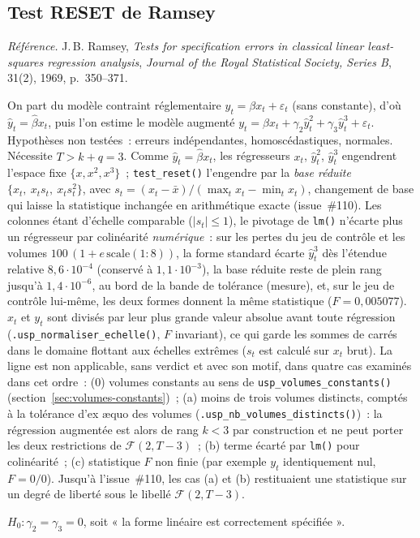 \documentclass[a4paper,11pt]{article}
\newcommand{\code}[1]{\texttt{\small #1}}
\newcommand{\refl}[1]{{\small\textcolor{maincolor!70!black}{\textit{Référence.} #1}}\par\smallskip}
\newcounter{ficheid}
\newenvironment{fiche}[1]{%
  \stepcounter{ficheid}%
  \phantomsection
  \subsection{#1}%
  \label{fiche:\theficheid}%
}{%
  \end{description}\vspace{0.5em}%
}
\newcommand{\Cadre}{%
  \begin{description}[leftmargin=0pt, style=unboxed, itemsep=3pt, topsep=3pt, parsep=2pt]%
  \item[\textcolor{financeblue}{\textbf{1. Cadre, notations et hypothèses de validité (non testées).}}]}
\newcommand{\Hzero}{\item[\textcolor{financeblue}{\textbf{2. Hypothèse nulle.}}]}
\begin{document}
\begin{fiche}{Test RESET de Ramsey}
\label{fiche:reset}%
\refl{J.\,B. Ramsey, \emph{Tests for specification errors in classical linear least-squares
regression analysis}, \emph{Journal of the Royal Statistical Society, Series B}, 31(2), 1969,
p.~350--371.}
\Cadre
On part du modèle contraint réglementaire $y_t = \beta x_t + \varepsilon_t$ (sans constante),
d'où $\hat y_t = \hat\beta x_t$, puis l'on estime le modèle augmenté
$y_t = \beta x_t + \gamma_2 \hat y_t^2 + \gamma_3 \hat y_t^3 + \varepsilon_t$.
Hypothèses non testées~: erreurs indépendantes, homoscédastiques, normales. Nécessite
$T > k + q = 3$. Comme $\hat y_t = \hat\beta x_t$, les régresseurs $x_t$, $\hat y_t^2$, $\hat y_t^3$
engendrent l'espace fixe $\{x, x^2, x^3\}$~; \code{test\_reset()} l'engendre par la \emph{base
réduite} $\{x_t,\ x_t s_t,\ x_t s_t^2\}$, avec $s_t = (x_t - \bar x)/(\max_t x_t - \min_t x_t)$,
changement de base qui laisse la statistique inchangée en arithmétique exacte (issue~\#110). Les
colonnes étant d'échelle comparable ($|s_t| \le 1$), le pivotage de \code{lm()} n'écarte plus
un régresseur par colinéarité \emph{numérique}~: sur les pertes du jeu de contrôle et les volumes
$100\,(1 + e\,\mathrm{scale}(1{:}8))$, la forme standard écarte $\hat y_t^3$ dès l'étendue
relative $8{,}6\cdot 10^{-4}$ (conservé à $1{,}1\cdot 10^{-3}$), la base réduite reste de plein
rang jusqu'à $1{,}4\cdot 10^{-6}$, au bord de la bande de tolérance (mesure), et, sur le jeu de
contrôle lui-même, les deux formes donnent la même statistique ($F = 0{,}005077$). $x_t$ et
$y_t$ sont divisés par leur plus grande valeur absolue avant toute régression
(\code{.usp\_normaliser\_echelle()}, $F$ invariant), ce qui garde les sommes de carrés dans le
domaine flottant aux échelles extrêmes ($s_t$ est calculé sur $x_t$ brut). La ligne est non
applicable, sans verdict et avec son motif, dans quatre cas examinés dans cet ordre~: (0)
volumes constants au sens de \code{usp\_volumes\_constants()}
(section~\ref{sec:volumes-constants})~; (a) moins de trois volumes distincts, comptés à la
tolérance d'ex \ae quo des volumes (\code{.usp\_nb\_volumes\_distincts()})~: la régression
augmentée est alors de rang $k < 3$ par construction et ne peut porter les deux restrictions de
$\mathcal{F}(2, T-3)$~; (b) terme écarté par \code{lm()} pour colinéarité~; (c) statistique $F$
non finie (par exemple $y_t$ identiquement nul, $F = 0/0$). Jusqu'à l'issue~\#110, les cas (a)
et (b) restituaient une statistique sur un degré de liberté sous le libellé
$\mathcal{F}(2, T-3)$.
\Hzero
$H_0 : \gamma_2 = \gamma_3 = 0$, soit « la forme linéaire est correctement spécifiée ».

\end{fiche}
\end{document}
